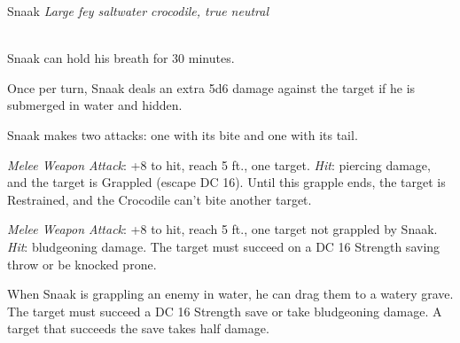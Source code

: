 \documentclass[letterpaper,10pt,twoside,twocolumn,openany]{book}
\begin{document}
\begin{monsterbox}{Snaak}
	\textit{Large fey saltwater crocodile, true neutral}\\
	\hline%
	\basics[%
	armorclass = 14 (natural armor),
	hitpoints  = \dice{6d12 + 15},
	speed      = {25 ft, swim 40 ft}
	]
	\hline%
	\stats[
    STR = \stat{21}, %
    DEX = \stat{9},
    CON = \stat{17},
    INT = \stat{7},
    WIS = \stat{10},
    CHA = \stat{5}
	]
	\hline%
	\details[%
	skills = {Stealth +9 (when underwater)},
	senses = {pp 10},
	languages = {Crocodile, understands Common and Sylvan but cannot speak},
	challenge = 2
	]
	\hline \\[1mm]
	\begin{monsteraction}
		Snaak can hold his breath for 30 minutes.
	\end{monsteraction}
	
	\begin{monsteraction}[Ambush]
		Once per turn, Snaak deals an extra 5d6 damage against the target if he is submerged in water and hidden.
	\end{monsteraction}
	\begin{monsteraction}[Multiattack]
		Snaak makes two attacks: one with its bite and one with its tail.
	\end{monsteraction}
	
	\begin{monsteraction}[Bite]
		\emph{Melee Weapon Attack}: +8 to hit, reach 5 ft., one target. \emph{Hit}:  piercing damage, and the target is Grappled (escape DC 16). Until this grapple ends, the target is Restrained, and the Crocodile can't bite another target.
	\end{monsteraction}

	\begin{monsteraction}[Tail]
		\emph{Melee Weapon Attack}: +8 to hit, reach 5 ft., one target not grappled by Snaak. \emph{Hit}:  bludgeoning damage. The target must succeed on a DC 16 Strength saving throw or be knocked prone.
	\end{monsteraction}

	\begin{monsteraction}[Drown]
		When Snaak is grappling an enemy in water, he can drag them to a watery grave. 
		The target must succeed a DC 16 Strength save or take  bludgeoning damage. 
		A target that succeeds the save takes half damage.
	\end{monsteraction}
\end{monsterbox}
\end{document}
